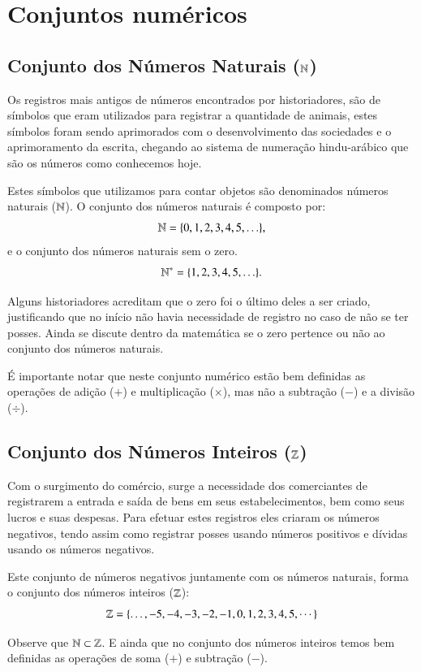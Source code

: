 \chapter{Conjuntos numéricos}

\section{Conjunto dos Números Naturais (\texorpdfstring{$\mathbb{N}$}{N})}

Os registros mais antigos de números encontrados por historiadores, são de símbolos que eram utilizados para registrar a quantidade de animais, estes símbolos foram sendo aprimorados com o desenvolvimento das sociedades e o aprimoramento da escrita, chegando ao sistema de numeração hindu-arábico que são os números como conhecemos hoje.

Estes símbolos que utilizamos para contar objetos são denominados números naturais ($\mathbb{N}$). O conjunto dos números naturais é composto por:
\[\mathbb{N}= \{0, 1, 2, 3, 4, 5, \ldots \},\]
e o conjunto dos números naturais sem o zero.
\[\mathbb{N}^{*}= \{1, 2, 3, 4, 5, \ldots \}.\]

Alguns historiadores acreditam que o zero foi o último deles a ser criado, justificando que no início não havia necessidade de registro no caso de não se ter posses. Ainda se discute dentro da matemática se o zero pertence ou não ao conjunto dos números naturais.

É importante notar que neste conjunto numérico estão bem definidas as operações de adição ($+$) e multiplicação ($\times$), mas não a subtração ($-$) e a divisão ($\div$).

\section{Conjunto dos Números Inteiros (\texorpdfstring{$\mathbb{Z}$}{Z})}

Com o surgimento do comércio, surge a necessidade dos comerciantes de registrarem a entrada e saída de bens em seus estabelecimentos, bem como seus lucros e suas despesas. Para efetuar estes registros eles criaram os números negativos, tendo assim como registrar posses usando números positivos e dívidas usando os números negativos.

Este conjunto de números negativos juntamente com os números naturais, forma o conjunto dos números inteiros ($\mathbb{Z}$):
\[\mathbb{Z}= \{ \ldots , -5, -4, -3, -2, -1, 0, 1, 2, 3, 4, 5, \cdots \}\]

Observe que $\mathbb{N} \subset \mathbb{Z}$. E ainda que no conjunto dos números inteiros temos bem definidas as operações de soma ($+$) e subtração ($-$).

